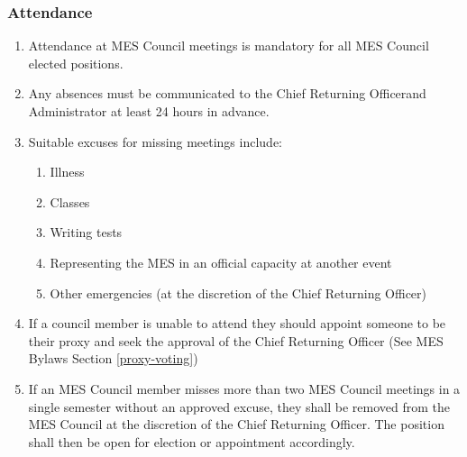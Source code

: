 \hypertarget{attendance}{%
 \subsubsection{Attendance}
 \label{attendance}}
\begin{enumerate}
 \item
  Attendance at MES Council meetings is mandatory for all MES Council
  elected positions.
 \item
  Any absences must be communicated to the Chief Returning Officerand
  Administrator at least 24 hours in advance.
 \item
  Suitable excuses for missing meetings include:

  \begin{enumerate}
   \item
    Illness
   \item
    Classes
   \item
    Writing tests
   \item
    Representing the MES in an official capacity at another event
   \item
    Other emergencies (at the discretion of the Chief Returning Officer)
  \end{enumerate}
 \item
  If a council member is unable to attend they should appoint someone to
  be their proxy and seek the approval of the Chief Returning Officer
  (See MES Bylaws Section \ref{proxy-voting})
 \item
  If an MES Council member misses more than two MES Council meetings in
  a single semester without an approved excuse, they shall be removed
  from the MES Council at the discretion of the Chief Returning Officer.
  The position shall then be open for election or appointment
  accordingly.
\end{enumerate}

